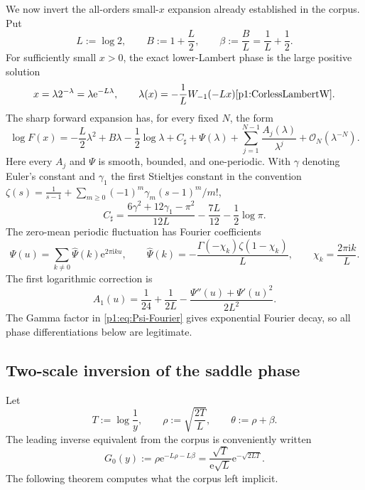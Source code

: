 \documentclass[11pt,oneside]{article}
\numberwithin{equation}{section}
\theoremstyle{definition}
\theoremstyle{remark}
\newcommand{\e}{\mathrm e}
\newcommand{\ii}{\mathrm i}
\newcommand{\bigO}{\mathcal O}
\begin{document}
We now invert the all-orders small-$x$ expansion already established in the corpus.
Put
\begin{equation}
 L:=\log2,
 \qquad B:=1+\frac L2,
 \qquad \beta:=\frac BL=\frac1L+\frac12.
 \label{p1:eq:L-B-beta}
\end{equation}
For sufficiently small $x>0$, the exact lower-Lambert phase is the large positive
solution
\begin{equation}
 x=\lambda2^{-\lambda}=\lambda\e^{-L\lambda},
 \qquad
 \lambda(x)=-\frac1L W_{-1}(-Lx) \cite{p1:CorlessLambertW}.
 \label{p1:eq:exact-lower-Lambert}
\end{equation}
The sharp forward expansion has, for every fixed $N$, the form
\begin{equation}
 \boxed{
 \log F(x)=
 -\frac L2\lambda^2+B\lambda-\frac12\log\lambda
 +C_{\sharp}+\Psi(\lambda)
 +\sum_{j=1}^{N-1}\frac{A_j(\lambda)}{\lambda^j}
 +\bigO_N(\lambda^{-N}).}
 \label{p1:eq:forward-endpoint-all-orders}
\end{equation}
Here every $A_j$ and $\Psi$ is smooth, bounded, and one-periodic.  With
$\gamma$ denoting Euler's constant and $\gamma_1$ the first Stieltjes constant in the
convention
\(
 \zeta(s)=\frac1{s-1}+\sum_{m\ge0}(-1)^m\gamma_m(s-1)^m/m!
\),
\begin{equation}
 C_{\sharp}=
 \frac{6\gamma^2+12\gamma_1-\pi^2}{12L}
 -\frac{7L}{12}-\frac12\log\pi.
 \label{p1:eq:Csharp}
\end{equation}
The zero-mean periodic fluctuation has Fourier coefficients
\begin{equation}
 \Psi(u)=\sum_{k\ne0}\widehat\Psi(k)\e^{2\pi\ii ku},
 \qquad
 \widehat\Psi(k)=-\frac{\Gamma(-\chi_k)\zeta(1-\chi_k)}{L},
 \qquad
 \chi_k=\frac{2\pi\ii k}{L}.
 \label{p1:eq:Psi-Fourier}
\end{equation}
The first logarithmic correction is
\begin{equation}
 \boxed{
 A_1(u)=\frac1{24}+\frac1{2L}
 -\frac{\Psi''(u)+\Psi'(u)^2}{2L^2}.}
 \label{p1:eq:A1-periodic}
\end{equation}
The Gamma factor in \eqref{p1:eq:Psi-Fourier} gives exponential Fourier decay, so all
phase differentiations below are legitimate.

\subsection{Two-scale inversion of the saddle phase}

Let
\begin{equation}
 T:=\log\frac1y,
 \qquad
 \rho:=\sqrt{\frac{2T}{L}},
 \qquad
 \theta:=\rho+\beta.
 \label{p1:eq:T-rho-theta}
\end{equation}
The leading inverse equivalent from the corpus is conveniently written
\begin{equation}
 G_0(y):=\rho\e^{-L\rho-L\beta}
 =\frac{\sqrt T}{\e\sqrt L}\e^{-\sqrt{2LT}}.
 \label{p1:eq:G0}
\end{equation}
The following theorem computes what the corpus left implicit.
\end{document}
